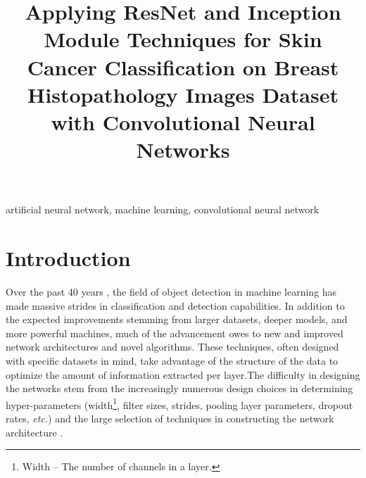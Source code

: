 \documentclass[conference]{IEEEtran}
\begin{document}


\title{Applying ResNet and Inception Module Techniques for Skin Cancer Classification on Breast Histopathology Images Dataset with Convolutional Neural Networks\\
}

\author{
}

\maketitle

\begin{abstract}

\end{abstract}

\begin{IEEEkeywords}
artificial neural network, machine learning, convolutional neural network
\end{IEEEkeywords}

\section{Introduction}
Over the past 40 years \cite{Fukushima1980}, the field of object detection in machine learning has made massive strides in classification and detection capabilities. In addition to the expected improvements stemming from larger datasets, deeper models, and more powerful machines, much of the advancement owes to new and improved network architectures and novel algorithms. These techniques, often designed with specific datasets in mind, take advantage of the structure of the data to optimize the amount of information extracted per layer.The difficulty in designing the networks stem from the increasingly numerous design choices in determining hyper-parameters (width\footnote{Width -- The number of channels in a layer.}, filter sizes, strides, pooling layer parameters, dropout rates, \emph{etc.}) and the large selection of techniques in constructing the network architecture \cite{Krizhevsky2012, Szegedy2014, He2016, Huang2016, Simonyan2014, Hu2017, Xie2017, huang2019convolutional, Zhao2021}.
\end{document}
